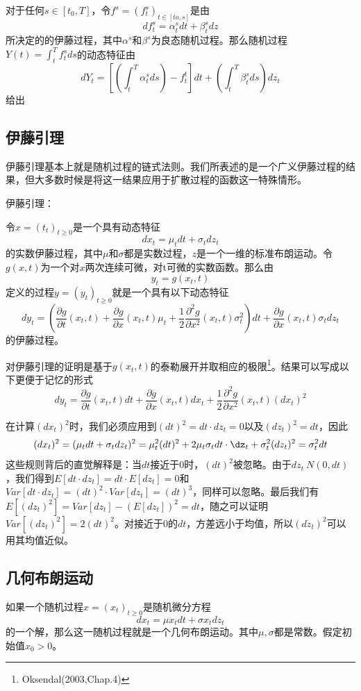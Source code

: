 \documentclass[UTF8]{ctexart}
\newcommand \qd[1] {\begin{qds} {#1} \end{qds}}
\begin{document}
对于任何$s \in [t_0,T]$，令$f^s=(f_t^s)_{t \in [to,s]}$是由$$df_t^s=\alpha_t^s dt+\beta_t^s dz$$所决定的的伊藤过程，其中$\alpha^s$和$\beta^s$为良态随机过程。那么随机过程$Y(t)=\int_t^T f_t^s ds$的动态特征由$$dY_t=[(\int_t^T \alpha_t^s ds)-f_t^t]dt+(\int_t^T \beta_t^s ds)dz_t$$给出

\subsection{伊藤引理}

伊藤引理基本上就是随机过程的链式法则。我们所表述的是一个广义伊藤过程的结果，但大多数时候是将这一结果应用于扩散过程的函数这一特殊情形。

\qd{伊藤引理：}令$x=(t_t)_{t \geqslant 0}$是一个具有动态特征$$dx_t=\mu_t dt +\sigma_t dz_t$$的实数伊藤过程，其中$\mu$和$\sigma$都是实数过程，$z$是一个一维的标准布朗运动。令$g(x,t)$为一个对$x$两次连续可微，对t可微的实数函数。那么由$$y_t=g(x_t,t)$$定义的过程$y=(y_t)_{t \geqslant 0}$就是一个具有以下动态特征$$dy_t=(\frac{\partial g}{\partial t}(x_t,t) 
+ \frac{\partial g}{\partial x}(x_t,t) \mu_t 
+ \frac{1}{2}\frac{\partial^2 g}{\partial x^2}(x_t,t) \sigma_t^2)dt
+\frac{\partial g}{\partial x}(x_t,t) \sigma_t dz_t$$的伊藤过程。

对伊藤引理的证明是基于$g(x_t,t)$的泰勒展开并取相应的极限\footnote{Oksendal(2003,Chap.4)}。结果可以写成以下更便于记忆的形式
$$dy_t=\frac{\partial g}{\partial t}(x_t,t) dt
+\frac{\partial g}{\partial x}(x_t,t) dx_t
+\frac{1}{2} \frac{\partial^2 g}{\partial x^2}(x_t,t)(dx_t)^2$$

在计算$(dx_t)^2$时，我们必须应用到$(dt)^2=dt \cdot dz_t =0$以及$(dz_t)^2=dt$，因此
$$(dx_t)^2=(\mu_t dt+\sigma_t dz_t)^2=\mu^2_t (dt)^2 +2 \mu_t \sigma_t dt \cdot \dz_t + \sigma^2_t (dz_t)^2=\sigma^2_tdt$$
这些规则背后的直觉解释是：当$dt$接近于0时，$(dt)^2$被忽略。由于$dz_t~N(0,dt)$，我们得到$E[dt \cdot dz_t]=dt \cdot E[dz_t]=0$和$Var[dt \cdot dz_t]=(dt)^2 \cdot Var[dz_t]=(dt)^3$，同样可以忽略。最后我们有$E[(dz_t)^2]=Var[dz_t]-(E[dz_t])^2=dt$，随之可以证明$Var[(dz_t)^2]=2(dt)^2$。对接近于0的$dt$，方差远小于均值，所以$(dz_t)^2$可以用其均值近似。

\subsection{几何布朗运动}

如果一个随机过程$x=(x_t)_{t \geqslant 0}$是随机微分方程$$dx_t=\mu x_t dt + \sigma x_t dz_t$$的一个解，那么这一随机过程就是一个几何布朗运动。其中$\mu,\sigma$都是常数。假定初始值$x_0>0$。
\end{document}
